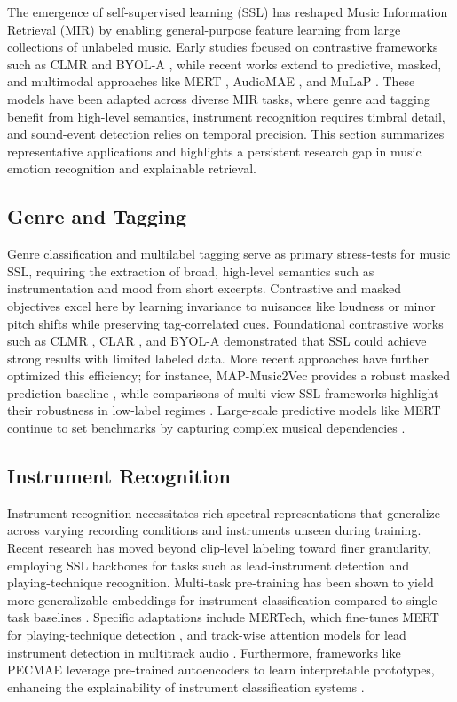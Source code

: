 \documentclass[12pt]{report}
\begin{document}
The emergence of self-supervised learning (SSL) has reshaped Music Information Retrieval (MIR) by enabling general-purpose feature learning from large collections of unlabeled music. Early studies focused on contrastive frameworks such as CLMR \cite{spijkervet_contrastive_2021} and BYOL-A \cite{niizumi_byol_2023}, while recent works extend to predictive, masked, and multimodal approaches like MERT \cite{li_mert_2024}, AudioMAE \cite{AudioMAE2022}, and MuLaP \cite{manco_learning_2022}. These models have been adapted across diverse MIR tasks, where genre and tagging benefit from high-level semantics, instrument recognition requires timbral detail, and sound-event detection relies on temporal precision. This section summarizes representative applications and highlights a persistent research gap in music emotion recognition and explainable retrieval.

\subsection{Genre and Tagging}
Genre classification and multilabel tagging serve as primary stress-tests for music SSL, requiring the extraction of broad, high-level semantics such as instrumentation and mood from short excerpts. Contrastive and masked objectives excel here by learning invariance to nuisances like loudness or minor pitch shifts while preserving tag-correlated cues. Foundational contrastive works such as CLMR \cite{spijkervet_contrastive_2021}, CLAR \cite{saeed_contrastive_2021}, and BYOL-A \cite{niizumi_byol_2023} demonstrated that SSL could achieve strong results with limited labeled data. More recent approaches have further optimized this efficiency; for instance, MAP-Music2Vec provides a robust masked prediction baseline \cite{li_map-music2vec_2022}, while comparisons of multi-view SSL frameworks highlight their robustness in low-label regimes \cite{meseguer-brocal_experimental_2024}. Large-scale predictive models like MERT continue to set benchmarks by capturing complex musical dependencies \cite{li_mert_2024}.

\subsection{Instrument Recognition}
Instrument recognition necessitates rich spectral representations that generalize across varying recording conditions and instruments unseen during training. Recent research has moved beyond clip-level labeling toward finer granularity, employing SSL backbones for tasks such as lead-instrument detection and playing-technique recognition. Multi-task pre-training has been shown to yield more generalizable embeddings for instrument classification compared to single-task baselines \cite{wu_multi-task_2021}. Specific adaptations include MERTech, which fine-tunes MERT for playing-technique detection \cite{li_mertech_2024}, and track-wise attention models for lead instrument detection in multitrack audio \cite{ou_lead_2025}. Furthermore, frameworks like PECMAE leverage pre-trained autoencoders to learn interpretable prototypes, enhancing the explainability of instrument classification systems \cite{alonso-jimenez_leveraging_2024}.
\end{document}
